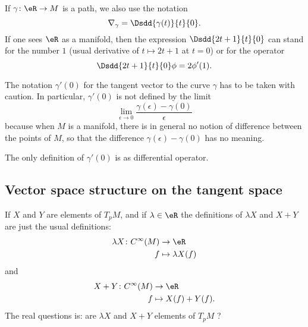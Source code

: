 If \( \gamma\colon \eR\to M\) is a path, we also use the notation
\begin{equation}        \label{EQooJQVRooLziKoH}
    \nabla_{\gamma}=\Dsdd{ \gamma(t) }{t}{0}.
\end{equation}
If one sees \( \eR\) as a manifold, then the expression \( \Dsdd{ 2t+1 }{t}{0}\) can stand for the number \( 1\) (usual derivative of \( t\mapsto 2t+1\) at \( t=0\)) or for the operator
\begin{equation}
    \Dsdd{ 2t+1 }{t}{0}\phi=2\phi'(1).
\end{equation}

\begin{remark}      \label{REMooJQFHooQuoZxt}
    The notation \( \gamma'(0)\) for the tangent vector to the curve \( \gamma\) has to be taken with caution. In particular, \( \gamma'(0)\) is not defined by the limit
    \begin{equation}        \label{EQooVMGFooFUCNEY}
        \lim_{\epsilon\to 0} \frac{ \gamma(\epsilon)-\gamma(0) }{ \epsilon }
    \end{equation}
    because when \( M\) is a manifold, there is in general no notion of difference between the points of \( M\), so that the difference \( \gamma(\epsilon)-\gamma(0)\) has no meaning.

    The only definition of \( \gamma'(0)\) is as differential operator.
\end{remark}

\subsection{Vector space structure on the tangent space}

If \( X\) and \( Y \) are elements of \( T_pM\), and if \( \lambda\in \eR\) the definitions of \( \lambda X\) and \( X+Y\) are just the usual definitions: 
\begin{equation}
    \begin{aligned}
        \lambda X\colon  C^{\infty}(M)&\to \eR \\
        f&\mapsto \lambda X(f) 
    \end{aligned}
\end{equation}
and
\begin{equation}
    \begin{aligned}
        X+Y\colon  C^{\infty}(M)&\to \eR \\
        f&\mapsto X(f)+Y(f). 
    \end{aligned}
\end{equation}
The real questions is: are \( \lambda X\) and \( X+Y\) elements of \( T_pM\) ?

